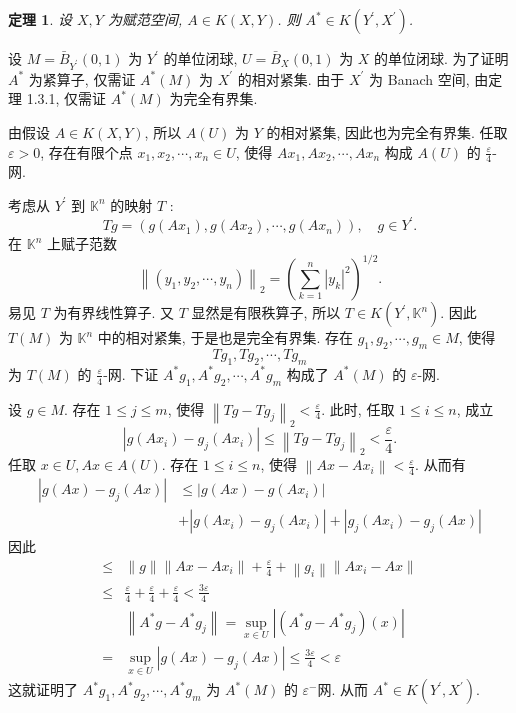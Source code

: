 \documentclass[openany]{ctexbook}
\makeatletter
\theoremstyle{kaiti}
\newtheorem{theorem}{定理}[section]
\theoremstyle{normal}
\renewenvironment{proof}[1][\proofname]{\par
    \pushQED{\qed}%
    \normalfont \topsep6\p@\@plus6\p@\relax
    \trivlist
    \item\relax
    {\heiti #1}\hspace{2\labelsep}\ignorespaces
  }{%
    \popQED\endtrivlist\@endpefalse
  }
\makeatother
\begin{document}
\begin{theorem}
设 $X, Y$ 为赋范空间, $A \in K(X, Y)$. 则 $A^{*} \in K\left(Y^{\prime}, X^{\prime}\right)$.
\end{theorem}

\begin{proof}
设 $M=\bar{B}_{Y^{\prime}}(0,1)$ 为 $Y^{\prime}$ 的单位闭球, $U=\bar{B}_{X}(0,1)$ 为 $X$ 的单位闭球. 为了证明 $A^{*}$ 为紧算子, 仅需证 $A^{*}(M)$ 为 $X^{\prime}$ 的相对紧集. 由于 $X^{\prime}$ 为 Banach 空间, 由定理 1.3.1, 仅需证 $A^{*}(M)$ 为完全有界集.

由假设 $A \in K(X, Y)$, 所以 $A(U)$ 为 $Y$ 的相对紧集, 因此也为完全有界集. 任取 $\varepsilon>0$, 存在有限个点 $x_1, x_2, \cdots, x_n \in U$, 使得 $A x_1, A x_2, \cdots, A x_n$ 构成 $A(U)$ 的 $\frac{\varepsilon}{4}$-网.

考虑从 $Y^{\prime}$ 到 $\mathbb{K}^n$ 的映射 $T$ :
$$
T g=\left(g\left(A x_1\right), g\left(A x_2\right), \cdots, g\left(A x_n\right)\right), \quad g \in Y^{\prime}.
$$
在 $\mathbb{K}^n$ 上赋子范数
$$
\left\|\left(y_1, y_2, \cdots, y_n\right)\right\|_2=\left(\sum_{k=1}^n\left|y_{k}\right|^2\right)^{1 / 2}.
$$
易见 $T$ 为有界线性算子. 又 $T$ 显然是有限秩算子, 所以 $T \in K\left(Y^{\prime}, \mathbb{K}^n\right)$. 因此 $T(M)$ 为 $\mathbb{K}^n$ 中的相对紧集, 于是也是完全有界集. 存在 $g_1, g_2, \cdots, g_m \in M$, 使得
$$
T g_1, T g_2, \cdots, T g_m
$$
为 $T(M)$ 的 $\frac{\varepsilon}{4}$-网. 下证 $A^{*} g_1, A^{*} g_2, \cdots, A^{*} g_m$ 构成了 $A^{*}(M)$ 的 $\varepsilon$-网.

设 $g \in M$. 存在 $1 \leqslant j \leqslant m$, 使得 $\left\|T g-T g_{j}\right\|_2<\frac{\varepsilon}{4}$. 此时, 任取 $1 \leqslant i \leqslant n$, 成立
$$
\left|g\left(A x_{i}\right)-g_{j}\left(A x_{i}\right)\right| \leqslant\left\|T g-T g_{j}\right\|_2<\frac{\varepsilon}{4}.
$$
任取 $x \in U, A x \in A(U)$. 存在 $1 \leqslant i \leqslant n$, 使得 $\left\|A x-A x_{i}\right\|<\frac{\varepsilon}{4}$. 从而有
$$
\begin{aligned}
\left|g(A x)-g_{j}(A x)\right| & \leqslant\left|g(A x)-g\left(A x_{i}\right)\right| \\
&+\left|g\left(A x_{i}\right)-g_{j}\left(A x_{i}\right)\right|+\left|g_{j}\left(A x_{i}\right)-g_{j}(A x)\right|
\end{aligned}
$$
因此
$$
\begin{aligned}
\leqslant &\|g\|\left\|A x-A x_{i}\right\|+\frac{\varepsilon}{4}+\left\|g_{i}\right\|\left\|A x_{i}-A x\right\| \\
\leqslant & \frac{\varepsilon}{4}+\frac{\varepsilon}{4}+\frac{\varepsilon}{4}<\frac{3 \varepsilon}{4} \\
&\left\|A^{*} g-A^{*} g_{j}\right\|=\sup_{x \in U}\left|\left(A^{*} g-A^{*} g_{j}\right)(x)\right| \\
=& \sup_{x \in U}\left|g(A x)-g_{j}(A x)\right| \leqslant \frac{3 \varepsilon}{4}<\varepsilon
\end{aligned}
$$
这就证明了 $A^{*} g_1, A^{*} g_2, \cdots, A^{*} g_m$ 为 $A^{*}(M)$ 的 $\varepsilon^{-}$网. 从而 $A^{*} \in K\left(Y^{\prime}, X^{\prime}\right)$.
\end{proof}
\end{document}
